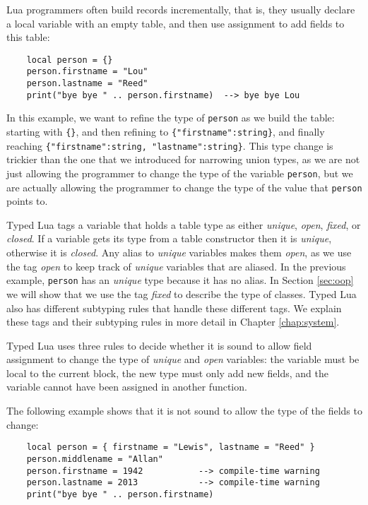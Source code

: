 Lua programmers often build records incrementally, that is,
they usually declare a local variable with an empty table,
and then use assignment to add fields to this table:
\begin{verbatim}
    local person = {}
    person.firstname = "Lou"
    person.lastname = "Reed"
    print("bye bye " .. person.firstname)  --> bye bye Lou
\end{verbatim}

In this example, we want to refine the type of \texttt{person} as
we build the table:
starting with \texttt{\{\}}, and then refining to \texttt{\{"firstname":string\}},
and finally reaching \texttt{\{"firstname":string, "lastname":string\}}.
This type change is trickier than the one that we introduced for narrowing
union types, as we are not just allowing the programmer to change
the type of the variable \texttt{person}, but we are actually allowing
the programmer to change the type of the value that \texttt{person} points to.

Typed Lua tags a variable that holds a table type as either
\emph{unique}, \emph{open}, \emph{fixed}, or \emph{closed}.
If a variable gets its type from a table constructor then it is
\emph{unique}, otherwise it is \emph{closed}.
Any alias to \emph{unique} variables makes them \emph{open}, as we use the
tag \emph{open} to keep track of \emph{unique} variables that are aliased.
In the previous example, \texttt{person} has an \emph{unique} type
because it has no alias.
In Section \ref{sec:oop} we will show that we use the tag
\emph{fixed} to describe the type of classes.
Typed Lua also has different subtyping rules that handle these
different tags.
We explain these tags and their subtyping rules in more detail
in Chapter \ref{chap:system}.

Typed Lua uses three rules to decide whether it is sound to
allow field assignment to change the type of \emph{unique} and
\emph{open} variables:
the variable must be local to the current block,
the new type must only add new fields, and
the variable cannot have been assigned in another function.

The following example shows that it is not sound to allow the
type of the fields to change:
\begin{verbatim}
    local person = { firstname = "Lewis", lastname = "Reed" }
    person.middlename = "Allan"
    person.firstname = 1942           --> compile-time warning
    person.lastname = 2013            --> compile-time warning
    print("bye bye " .. person.firstname)
\end{verbatim}

